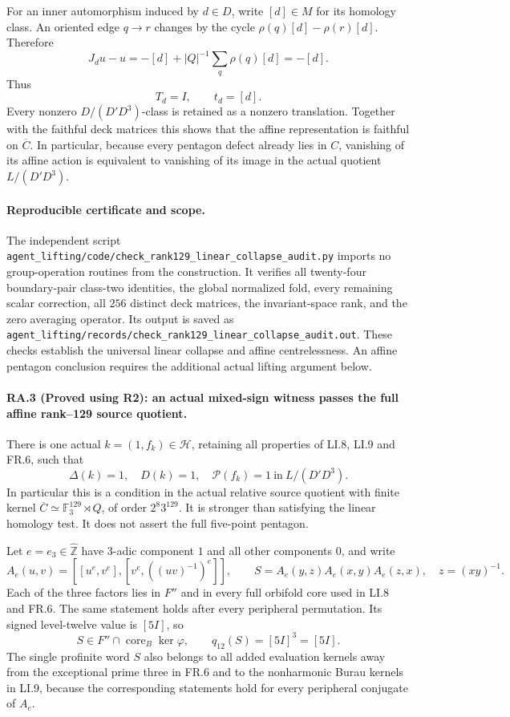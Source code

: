 For an inner automorphism induced by $d\in D$, write
$[d]\in M$ for its homology class.  An oriented edge $q\to r$
changes by the cycle
$\rho(q)[d]-\rho(r)[d]$.  Therefore
\[
 J_d u-u=-[d]+|Q|^{-1}\sum_q\rho(q)[d]=-[d].
\]
Thus
\[
 T_d=I,\qquad t_d=[d].
\]
Every nonzero $D/(D'D^3)$-class is retained as a nonzero
translation.  Together with the faithful deck matrices this
shows that the affine representation is faithful on $\overline C$.
In particular, because every pentagon defect already lies in $C$,
vanishing of its affine action is equivalent to vanishing of its
image in the actual quotient $L/(D'D^3)$.

\paragraph{Reproducible certificate and scope.}
The independent script
\texttt{agent\_lifting/code/check\_rank129\_linear\_collapse\_audit.py}
imports no group-operation routines from the construction.
It verifies all twenty-four boundary-pair class-two identities,
the global normalized fold, every remaining scalar correction,
all $256$ distinct deck matrices, the invariant-space rank, and
the zero averaging operator.  Its output is saved as
\texttt{agent\_lifting/records/check\_rank129\_linear\_collapse\_audit.out}.
These checks establish the universal linear collapse and affine
centrelessness.  An affine pentagon conclusion requires the
additional actual lifting argument below.

\paragraph{RA.3 (Proved using R2): an actual mixed-sign witness
passes the full affine rank--129 source quotient.}
There is one actual $k=(1,f_k)\in\mathcal H$, retaining all
properties of LI.8, LI.9 and FR.6, such that
\[
 \boxed{\quad \Delta(k)=1,\quad D(k)=1,\quad
  \mathcal P(f_k)=1\ \text{in}\
  L/(D'D^3).\quad}
\]
In particular this is a condition in the actual relative source
quotient with finite kernel
$\overline C\simeq\mathbb F_3^{129}\rtimes Q$, of order
$2^8 3^{129}$.  It is stronger than satisfying the linear
homology test.  It does not assert the full five-point pentagon.

Let $e=e_3\in\widehat{\mathbb Z}$ have $3$-adic component
$1$ and all other components $0$, and write
\[
 A_e(u,v)=[[u^e,v^e],[v^e,((uv)^{-1})^e]],
 \qquad
 S=A_e(y,z)A_e(x,y)A_e(z,x),\quad z=(xy)^{-1}.
\]
Each of the three factors lies in $F''$ and in every full
orbifold core used in LI.8 and FR.6.  The same statement
holds after every peripheral permutation.  Its signed
level-twelve value is $[5I]$, so
\[
 S\in F''\cap\operatorname{core}_B\ker\varphi,
 \qquad q_{12}(S)=[5I]^3=[5I].
\]
The single profinite word $S$ also belongs to all added
evaluation kernels away from the exceptional prime three
in FR.6 and to the nonharmonic Burau kernels in LI.9,
because the corresponding statements hold for every
peripheral conjugate of $A_e$.

